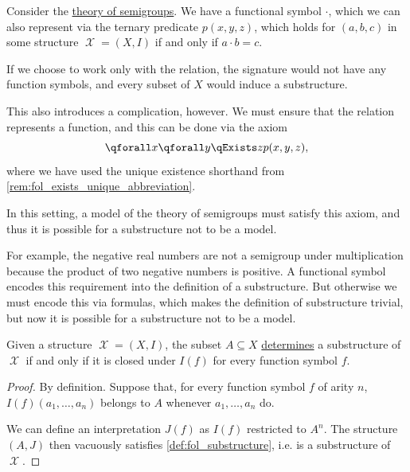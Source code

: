 \begin{example}\label{ex:replacing_functional_symbols_via_relations}
  Consider the \hyperref[def:semigroup/theory]{theory of semigroups}. We have a functional symbol \( \cdot \), which we can also represent via the ternary predicate \( p(x, y, z) \), which holds for \( (a, b, c) \) in some structure \( \mscrX = (X, I) \) if and only if \( a \cdot b = c \).

  If we choose to work only with the relation, the signature would not have any function symbols, and every subset of \( X \) would induce a substructure.

  This also introduces a complication, however. We must ensure that the relation represents a function, and this can be done via the axiom
  \begin{equation*}
    \qforall x \qforall y \qExists z p(x, y, z),
  \end{equation*}
  where we have used the unique existence shorthand from \cref{rem:fol_exists_unique_abbreviation}.

  In this setting, a model of the theory of semigroups must satisfy this axiom, and thus it is possible for a substructure not to be a model.

  For example, the negative real numbers are not a semigroup under multiplication because the product of two negative numbers is positive. A functional symbol encodes this requirement into the definition of a substructure. But otherwise we must encode this via formulas, which makes the definition of substructure trivial, but now it is possible for a substructure not to be a model.
\end{example}

\begin{proposition}\label{thm:fol_substructure_characterization}
  Given a structure \( \mscrX = (X, I) \), the subset \( A \subseteq X \) \hyperref[def:fol_substructure/determines]{determines} a substructure of \( \mscrX \) if and only if it is closed under \( I(f) \) for every function symbol \( f \).
\end{proposition}
\begin{proof}
  \SufficiencySubProof By definition.
  \NecessitySubProof Suppose that, for every function symbol \( f \) of arity \( n \), \( I(f)(a_1, \ldots, a_n) \) belongs to \( A \) whenever \( a_1, \ldots, a_n \) do.

  We can define an interpretation \( J(f) \) as \( I(f) \) restricted to \( A^n \). The structure \( (A, J) \) then vacuously satisfies \cref{def:fol_substructure}, i.e. is a substructure of \( \mscrX \).
\end{proof}

